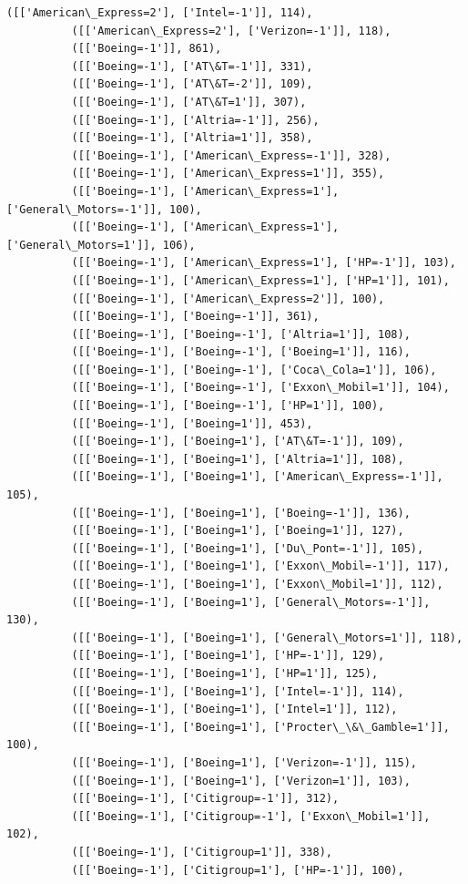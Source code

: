 \documentclass[11pt]{article}
\begin{document}
\begin{Verbatim}[commandchars=\\\{\}]
          ([['American\_Express=2'], ['Intel=-1']], 114),
          ([['American\_Express=2'], ['Verizon=-1']], 118),
          ([['Boeing=-1']], 861),
          ([['Boeing=-1'], ['AT\&T=-1']], 331),
          ([['Boeing=-1'], ['AT\&T=-2']], 109),
          ([['Boeing=-1'], ['AT\&T=1']], 307),
          ([['Boeing=-1'], ['Altria=-1']], 256),
          ([['Boeing=-1'], ['Altria=1']], 358),
          ([['Boeing=-1'], ['American\_Express=-1']], 328),
          ([['Boeing=-1'], ['American\_Express=1']], 355),
          ([['Boeing=-1'], ['American\_Express=1'], ['General\_Motors=-1']], 100),
          ([['Boeing=-1'], ['American\_Express=1'], ['General\_Motors=1']], 106),
          ([['Boeing=-1'], ['American\_Express=1'], ['HP=-1']], 103),
          ([['Boeing=-1'], ['American\_Express=1'], ['HP=1']], 101),
          ([['Boeing=-1'], ['American\_Express=2']], 100),
          ([['Boeing=-1'], ['Boeing=-1']], 361),
          ([['Boeing=-1'], ['Boeing=-1'], ['Altria=1']], 108),
          ([['Boeing=-1'], ['Boeing=-1'], ['Boeing=1']], 116),
          ([['Boeing=-1'], ['Boeing=-1'], ['Coca\_Cola=1']], 106),
          ([['Boeing=-1'], ['Boeing=-1'], ['Exxon\_Mobil=1']], 104),
          ([['Boeing=-1'], ['Boeing=-1'], ['HP=1']], 100),
          ([['Boeing=-1'], ['Boeing=1']], 453),
          ([['Boeing=-1'], ['Boeing=1'], ['AT\&T=-1']], 109),
          ([['Boeing=-1'], ['Boeing=1'], ['Altria=1']], 108),
          ([['Boeing=-1'], ['Boeing=1'], ['American\_Express=-1']], 105),
          ([['Boeing=-1'], ['Boeing=1'], ['Boeing=-1']], 136),
          ([['Boeing=-1'], ['Boeing=1'], ['Boeing=1']], 127),
          ([['Boeing=-1'], ['Boeing=1'], ['Du\_Pont=-1']], 105),
          ([['Boeing=-1'], ['Boeing=1'], ['Exxon\_Mobil=-1']], 117),
          ([['Boeing=-1'], ['Boeing=1'], ['Exxon\_Mobil=1']], 112),
          ([['Boeing=-1'], ['Boeing=1'], ['General\_Motors=-1']], 130),
          ([['Boeing=-1'], ['Boeing=1'], ['General\_Motors=1']], 118),
          ([['Boeing=-1'], ['Boeing=1'], ['HP=-1']], 129),
          ([['Boeing=-1'], ['Boeing=1'], ['HP=1']], 125),
          ([['Boeing=-1'], ['Boeing=1'], ['Intel=-1']], 114),
          ([['Boeing=-1'], ['Boeing=1'], ['Intel=1']], 112),
          ([['Boeing=-1'], ['Boeing=1'], ['Procter\_\&\_Gamble=1']], 100),
          ([['Boeing=-1'], ['Boeing=1'], ['Verizon=-1']], 115),
          ([['Boeing=-1'], ['Boeing=1'], ['Verizon=1']], 103),
          ([['Boeing=-1'], ['Citigroup=-1']], 312),
          ([['Boeing=-1'], ['Citigroup=-1'], ['Exxon\_Mobil=1']], 102),
          ([['Boeing=-1'], ['Citigroup=1']], 338),
          ([['Boeing=-1'], ['Citigroup=1'], ['HP=-1']], 100),

\end{Verbatim}
\end{document}
